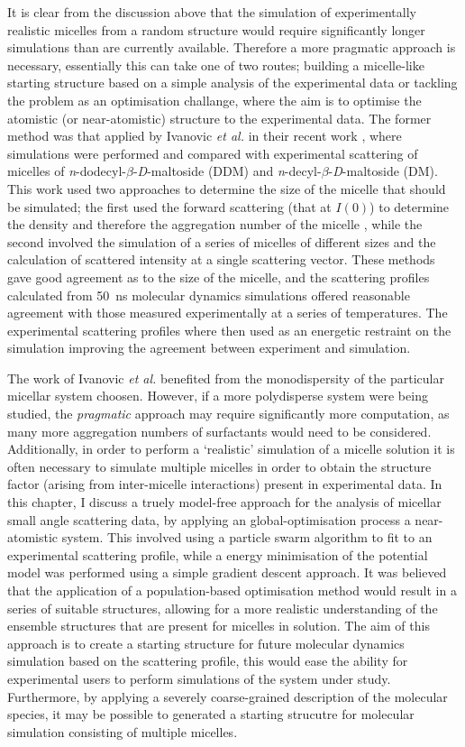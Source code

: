It is clear from the discussion above that the simulation of experimentally realistic micelles from a random structure would require significantly longer simulations than are currently available.
Therefore a more pragmatic approach is necessary, essentially this can take one of two routes; building a micelle-like starting structure based on a simple analysis of the experimental data or tackling the problem as an optimisation challange, where the aim is to optimise the atomistic (or near-atomistic) structure to the experimental data.
The former method was that applied by Ivanovic \emph{et al.} in their recent work \cite{ivanovic_temperature-dependent_2018}, where simulations were performed and compared with experimental scattering of micelles of \emph{n}-dodecyl-$\beta$-\emph{D}-maltoside (DDM) and \emph{n}-decyl-$\beta$-\emph{D}-maltoside (DM).
This work used two approaches to determine the size of the micelle that should be simulated; the first used the forward scattering (that at $I(0)$) to determine the density and therefore the aggregation number of the micelle \cite{lipfert_size_2007}, while the second involved the simulation of a series of micelles of different sizes and the calculation of scattered intensity at a single scattering vector.
These methods gave good agreement as to the size of the micelle, and the scattering profiles calculated from \SI{50}{\nano\second} molecular dynamics simulations offered reasonable agreement with those measured experimentally at a series of temperatures.
The experimental scattering profiles where then used as an energetic restraint on the simulation improving the agreement between experiment and simulation.

The work of Ivanovic \emph{et al.} benefited from the monodispersity of the particular micellar system choosen.
However, if a more polydisperse system were being studied, the \emph{pragmatic} approach may require significantly more computation, as many more aggregation numbers of surfactants would need to be considered.
Additionally, in order to perform a `realistic' simulation of a micelle solution it is often necessary to simulate multiple micelles in order to obtain the structure factor (arising from inter-micelle interactions) present in experimental data.
In this chapter, I discuss a truely model-free approach for the analysis of micellar small angle scattering data, by applying an global-optimisation process a near-atomistic system.
This involved using a particle swarm algorithm to fit to an experimental scattering profile, while a energy minimisation of the potential model was performed using a simple gradient descent approach.
It was believed that the application of a population-based optimisation method would result in a series of suitable structures, allowing for a more realistic understanding of the ensemble structures that are present for micelles in solution.
The aim of this approach is to create a starting structure for future molecular dynamics simulation based on the scattering profile, this would ease the ability for experimental users to perform simulations of the system under study.
Furthermore, by applying a severely coarse-grained description of the molecular species, it may be possible to generated a starting strucutre for molecular simulation consisting of multiple micelles.
